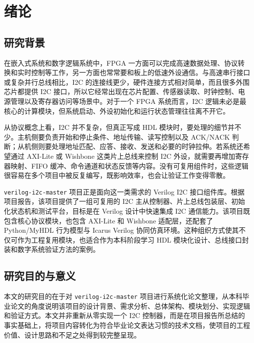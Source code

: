 \documentclass[12pt,a4paper]{article}
\numberwithin{equation}{section}
\begin{document}
\clearpage

\tableofcontents
\clearpage

\setcounter{page}{1}

\clearpage
\section{绪论}

\subsection{研究背景}

在嵌入式系统和数字逻辑系统中，FPGA 一方面可以完成高速数据处理、协议转换和实时控制等工作，另一方面也常常要和板上的低速外设通信。与高速串行接口或复杂并行总线相比，I2C 的连接线更少，硬件连接方式相对简单，而且很多外围芯片都提供 I2C 接口，所以它经常出现在芯片配置、传感器读取、时钟控制、电源管理以及寄存器访问等场景中。对于一个 FPGA 系统而言，I2C 逻辑未必是最核心的计算模块，但系统启动、外设初始化和运行状态管理往往离不开它。

从协议概念上看，I2C 并不复杂，但真正写成 HDL 模块时，要处理的细节并不少。主机侧要负责开始和停止条件、地址传输、读写控制以及 ACK/NACK 判断；从机侧则要处理地址匹配、应答、接收、发送和必要的时钟拉伸。若系统还希望通过 AXI-Lite 或 Wishbone 这类片上总线来控制 I2C 外设，就需要再增加寄存器映射、FIFO 缓冲、命令通道和状态反馈等内容。没有可复用组件时，这些逻辑很容易在多个项目中被反复编写，既影响效率，也会让验证工作变得零散。

\texttt{verilog-i2c-master} 项目正是面向这一类需求的 Verilog I2C 接口组件库。根据项目报告，该项目提供了一组可复用的 I2C 主从控制器、片上总线包装层、初始化状态机和测试平台，目标是在 Verilog 设计中快速集成 I2C 通信能力。该项目既包含核心协议模块，也包含 AXI-Lite 和 Wishbone 适配层，还配套了 Python/MyHDL 行为模型与 Icarus Verilog 协同仿真环境。这种组织方式使其不仅可作为工程复用模块，也适合作为本科阶段学习 HDL 模块化设计、总线接口封装和数字系统验证方法的案例。

\subsection{研究目的与意义}

本文的研究目的在于对 \texttt{verilog-i2c-master} 项目进行系统化论文整理，从本科毕业论文的角度说明该项目的设计背景、需求分析、总体架构、模块划分、实现逻辑和验证方式。本文并非重新从零实现一个 I2C 控制器，而是在项目报告所总结的事实基础上，将项目内容转化为符合毕业论文表达习惯的技术文档，使项目的工程价值、设计思路和不足之处得到较完整呈现。
\end{document}

